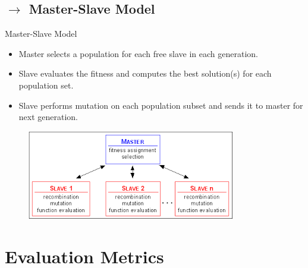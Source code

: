 \documentclass[10pt]{beamer}
\begin{document}
\subsection{$\rightarrow$ Master-Slave Model}
\begin{frame}{Master-Slave Model}
    \begin{minipage}{0.48\linewidth}
        \begin{itemize}
            \item<1-> Master selects a population for each free slave in each generation.
            \item<2-> Slave evaluates the fitness and computes the best solution(s) for each population set.
            \item<3-> Slave performs mutation on each population subset and sends it to master for next generation.
        \end{itemize}
    \end{minipage}
    \begin{minipage}{0.5\linewidth}
        \begin{figure}
            \centering
            \includegraphics[scale=0.5]{figures/master-slave}
            \label{fig:master-slave}
        \end{figure}
    \end{minipage}
\end{frame}

\section{Evaluation Metrics}
\end{document}
